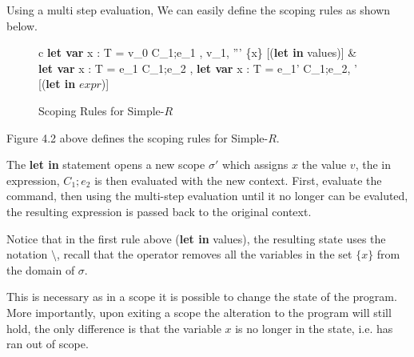 \documentclass[a4paper,12pt]{report}
\begin{document}
\par
Using a multi step evaluation, We can easily define the scoping rules as shown 
below.
  
\begin{figure}[H]
  \begin{center}
    \begin{tabular}{c}
      {\langle\textbf{let var }x : T = v_0  C_1;e_1 , \sigma \rangle 
      \Longrightarrow \langle v_1, \sigma''' \setminus \{x\} \rangle} [(\textbf{let in} values)] 
      & \\
      \footnotesize
      {\langle \textbf{let var }x : T = e_1  C_1;e_2 , \sigma \rangle 
      \Longrightarrow \langle\textbf{let var }x : T = e_1'  C_1;e_2, \sigma' \rangle} 
      [(\textbf{let in} $expr$)]
      \normalsize
    \end{tabular}
  \end{center}
  \caption{Scoping Rules for Simple-$R$}
\end{figure}

\par
Figure 4.2 above defines the scoping rules for Simple-$R$.

\par
The \textbf{let in} statement opens a new scope $\sigma'$ which 
assigns $x$ the value $v$, the in expression, $C_1;e_2$ is then evaluated with the 
new context. First, evaluate the command, then using the multi-step 
evaluation until it no longer can be evaluted, the resulting expression is 
passed back to the original context.

\par 
Notice that in the first rule above (\textbf{let in } values), the resulting state 
uses the notation $\setminus$, recall that the operator removes all the variables 
in the set $\{x\}$ from the domain of $\sigma$. 

\par
This is necessary as in a scope it is possible to change the state of the 
program. More importantly, upon exiting a scope the alteration to the program 
will still hold, the only difference is that the variable $x$ is no longer in 
the state, i.e. has ran out of scope.
\end{document}
